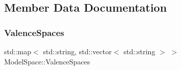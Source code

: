 \subsection{Member Data Documentation}
\mbox{\label{classModelSpace_a21e4c6a5d3955dc9bf468cece4b8acc5}} 
\subsubsection{\texorpdfstring{Valence\+Spaces}{ValenceSpaces}}
{\footnotesize\ttfamily std\+::map$<$ std\+::string, std\+::vector$<$ std\+::string $>$ $>$ Model\+Space\+::\+Valence\+Spaces\hspace{0.3cm}{\ttfamily [static]}}

